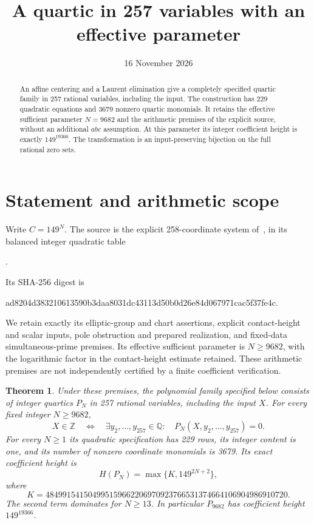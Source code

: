 \documentclass[11pt,a4paper]{article}
\title{A quartic in 257 variables with an effective parameter}
\author{}\date{16 November 2026}
\newtheorem{theorem}{Theorem}[section]
\newcommand{\Q}{\mathbb Q}\newcommand{\Z}{\mathbb Z}
\begin{document}
\maketitle

\begin{abstract}
An affine centering and a Laurent elimination give a completely
specified quartic family in 257 rational variables, including the
input. The construction has 229 quadratic equations and 3679 nonzero
quartic monomials. It retains the effective sufficient parameter
$N=9682$ and the arithmetic premises of the explicit source, without
an additional $abc$ assumption. At this parameter its integer
coefficient height is exactly $149^{19366}$. The transformation is
an input-preserving bijection on the full rational zero sets.
\end{abstract}

\section{Statement and arithmetic scope}

Write $C=149^N$. The source is the explicit 258-coordinate system
of~\cite{Laurent,Explicit}, in its balanced integer quadratic table
\begin{center}\small
{}.
\end{center}
Its SHA-256 digest is
\begin{center}\small\ttfamily
ad8204d383210613590b3daa8031dc43113d50b0d26e84d067971cac5f37fe4c.
\end{center}
We retain exactly its elliptic-group and chart assertions, explicit
contact-height and scalar inputs, pole obstruction and prepared
realization, and fixed-data simultaneous-prime premises. Its effective
sufficient parameter is $N\ge9682$, with the logarithmic factor in
the contact-height estimate retained. These arithmetic premises are
not independently certified by a finite coefficient verification.

\begin{theorem}\label{thm:main}
Under these premises, the polynomial family specified below consists
of integer quartics $P_N$ in 257 rational variables, including the
input $X$. For every fixed integer $N\ge9682$,
\[
 X\in\Z\quad\Longleftrightarrow\quad
 \exists y_2,\ldots,y_{257}\in\Q:\quad
 P_N(X,y_2,\ldots,y_{257})=0.
\]
For every $N\ge1$ its quadratic specification has 229 rows, its
integer content is one, and its number of nonzero coordinate
monomials is 3679. Its exact coefficient height is
\[
 H(P_N)=\max\{K,149^{2N+2}\},
\]
where
\[
 K=484991541504995159662206970923766531374664106904986910720.
\]
The second term dominates for $N\ge13$. In particular $P_{9682}$
has coefficient height $149^{19366}$.
\end{theorem}
\end{document}
